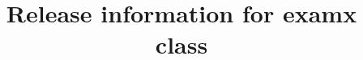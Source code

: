\documentclass{ltxdoc}
\title{Release information for \textsf{examx} class}
\begin{document}
\maketitle
    
\NumberOfFilesInRelease

\PrintReleaseFileInfo
\end{document}
